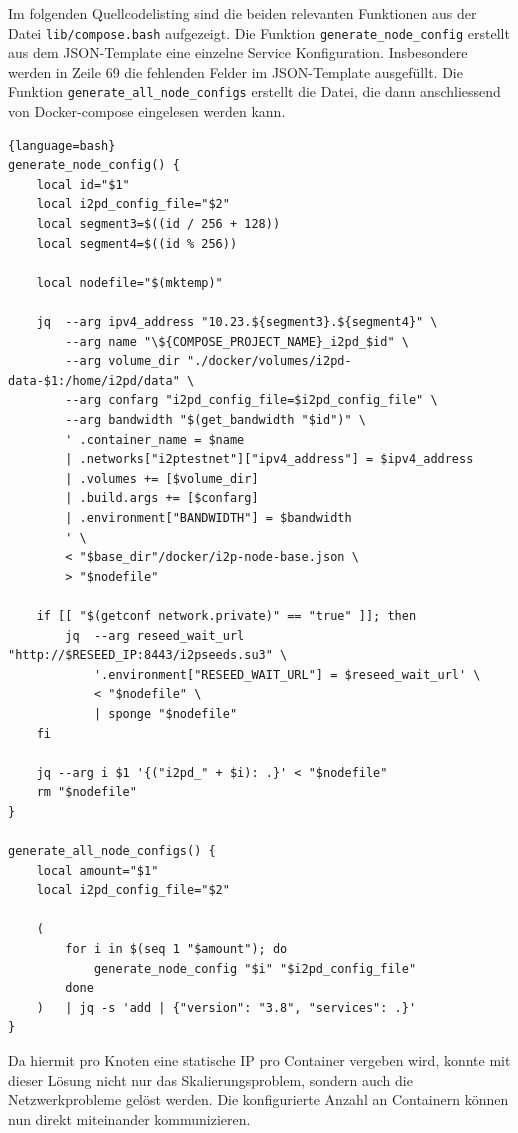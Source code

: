 Im folgenden Quellcodelisting sind die beiden relevanten Funktionen aus der Datei \lstinline|lib/compose.bash| aufgezeigt.
Die Funktion \lstinline|generate_node_config| erstellt aus dem JSON-Template eine einzelne Service Konfiguration.
Insbesondere werden in Zeile 69 die fehlenden Felder im JSON-Template ausgefüllt.
Die Funktion \lstinline|generate_all_node_configs| erstellt die Datei,
die dann anschliessend von Docker-compose eingelesen werden kann.

\begin{lstlisting}[firstnumber=61]{language=bash}
generate_node_config() {
    local id="$1"
    local i2pd_config_file="$2"
    local segment3=$((id / 256 + 128))
    local segment4=$((id % 256))

    local nodefile="$(mktemp)"

    jq  --arg ipv4_address "10.23.${segment3}.${segment4}" \
        --arg name "\${COMPOSE_PROJECT_NAME}_i2pd_$id" \
        --arg volume_dir "./docker/volumes/i2pd-data-$1:/home/i2pd/data" \
        --arg confarg "i2pd_config_file=$i2pd_config_file" \
        --arg bandwidth "$(get_bandwidth "$id")" \
        ' .container_name = $name
        | .networks["i2ptestnet"]["ipv4_address"] = $ipv4_address
        | .volumes += [$volume_dir]
        | .build.args += [$confarg]
        | .environment["BANDWIDTH"] = $bandwidth
        ' \
        < "$base_dir"/docker/i2p-node-base.json \
        > "$nodefile"

    if [[ "$(getconf network.private)" == "true" ]]; then
        jq  --arg reseed_wait_url "http://$RESEED_IP:8443/i2pseeds.su3" \
            '.environment["RESEED_WAIT_URL"] = $reseed_wait_url' \
            < "$nodefile" \
            | sponge "$nodefile"
    fi

    jq --arg i $1 '{("i2pd_" + $i): .}' < "$nodefile"
    rm "$nodefile"
}

generate_all_node_configs() {
    local amount="$1"
    local i2pd_config_file="$2"

    (
        for i in $(seq 1 "$amount"); do
            generate_node_config "$i" "$i2pd_config_file"
        done
    )   | jq -s 'add | {"version": "3.8", "services": .}'
}
\end{lstlisting}

Da hiermit pro Knoten eine statische IP pro Container vergeben wird,
konnte mit dieser Lösung nicht nur das Skalierungsproblem, sondern auch die Netzwerkprobleme gelöst werden.
Die konfigurierte Anzahl an Containern können nun direkt miteinander kommunizieren.

